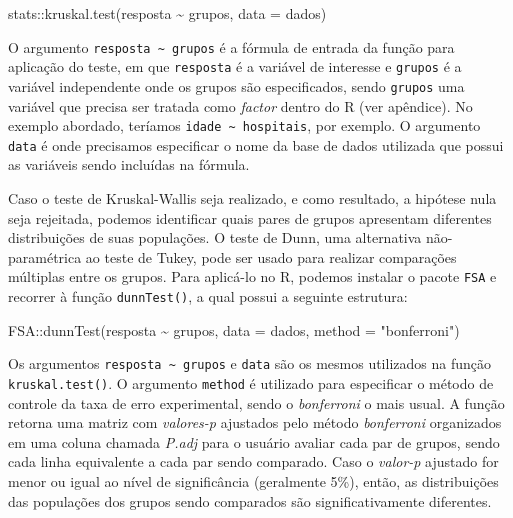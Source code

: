 \documentclass[
  letterpaper,
  DIV=11,
  numbers=noendperiod]{scrreprt}
\newenvironment{Shaded}{\begin{snugshade}}{\end{snugshade}}
\newcommand{\AttributeTok}[1]{\textcolor[rgb]{0.40,0.45,0.13}{#1}}
\newcommand{\FunctionTok}[1]{\textcolor[rgb]{0.28,0.35,0.67}{#1}}
\newcommand{\NormalTok}[1]{\textcolor[rgb]{0.00,0.23,0.31}{#1}}
\newcommand{\SpecialCharTok}[1]{\textcolor[rgb]{0.37,0.37,0.37}{#1}}
\newcommand{\StringTok}[1]{\textcolor[rgb]{0.13,0.47,0.30}{#1}}
\begin{document}
\begin{Shaded}
\begin{Highlighting}[]
\NormalTok{stats}\SpecialCharTok{::}\FunctionTok{kruskal.test}\NormalTok{(resposta }\SpecialCharTok{\textasciitilde{}}\NormalTok{ grupos, }\AttributeTok{data =}\NormalTok{ dados)}
\end{Highlighting}
\end{Shaded}

O argumento \texttt{resposta\ \textasciitilde{}\ grupos} é a fórmula de
entrada da função para aplicação do teste, em que \texttt{resposta} é a
variável de interesse e \texttt{grupos} é a variável independente onde
os grupos são especificados, sendo \texttt{grupos} uma variável que
precisa ser tratada como \emph{factor} dentro do R (ver apêndice). No
exemplo abordado, teríamos \texttt{idade\ \textasciitilde{}\ hospitais},
por exemplo. O argumento \texttt{data} é onde precisamos especificar o
nome da base de dados utilizada que possui as variáveis sendo incluídas
na fórmula.

Caso o teste de Kruskal-Wallis seja realizado, e como resultado, a
hipótese nula seja rejeitada, podemos identificar quais pares de grupos
apresentam diferentes distribuições de suas populações. O teste de Dunn,
uma alternativa não-paramétrica ao teste de Tukey, pode ser usado para
realizar comparações múltiplas entre os grupos. Para aplicá-lo no R,
podemos instalar o pacote \texttt{FSA} e recorrer à função
\texttt{dunnTest()}, a qual possui a seguinte estrutura:

\begin{Shaded}
\begin{Highlighting}[]
\NormalTok{FSA}\SpecialCharTok{::}\FunctionTok{dunnTest}\NormalTok{(resposta }\SpecialCharTok{\textasciitilde{}}\NormalTok{ grupos, }\AttributeTok{data =}\NormalTok{ dados, }\AttributeTok{method =} \StringTok{"bonferroni"}\NormalTok{)}
\end{Highlighting}
\end{Shaded}

Os argumentos \texttt{resposta\ \textasciitilde{}\ grupos} e
\texttt{data} são os mesmos utilizados na função
\texttt{kruskal.test()}. O argumento \texttt{method} é utilizado para
especificar o método de controle da taxa de erro experimental, sendo o
\emph{bonferroni} o mais usual. A função retorna uma matriz com
\emph{valores-p} ajustados pelo método \emph{bonferroni} organizados em
uma coluna chamada \emph{P.adj} para o usuário avaliar cada par de
grupos, sendo cada linha equivalente a cada par sendo comparado. Caso o
\emph{valor-p} ajustado for menor ou igual ao nível de significância
(geralmente 5\%), então, as distribuições das populações dos grupos
sendo comparados são significativamente diferentes.
\end{document}
